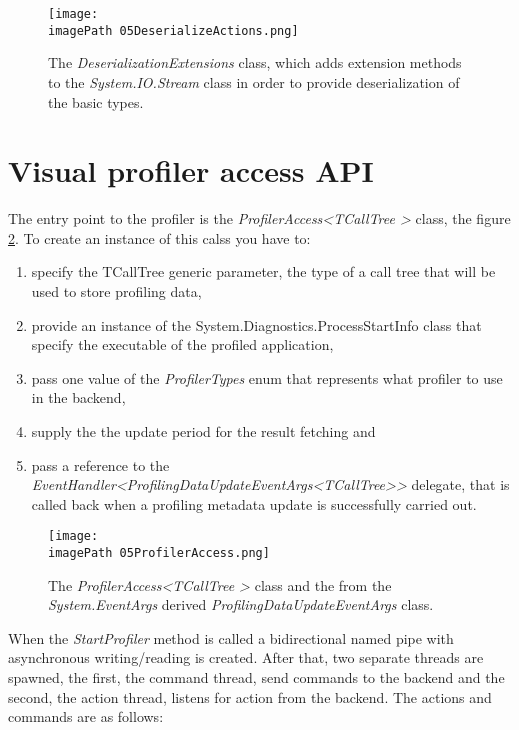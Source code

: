 \begin{figure}
	\centering
		\texttt{[image: \\imagePath 05DeserializeActions.png]}
		\caption{The \textit{DeserializationExtensions} class, which adds extension methods to the \textit{System.IO.Stream} class in order to provide deserialization of the basic types. }
	\label{fig:05DeserializeActions}
\end{figure}

\section{Visual profiler access API}
The entry point to the profiler is the \textit{ProfilerAccess\textless TCallTree \textgreater} class, the figure \ref{fig:05ProfilerAccess}. To create an instance of this calss you have to:
\begin{enumerate}

\item specify the TCallTree generic parameter, the type of a call tree that will be used to store profiling data,

\item provide an instance of the System.Diagnostics.ProcessStartInfo class that specify the executable of the profiled application,

\item pass one value of the \textit{ProfilerTypes} enum that represents what profiler to use in the backend,

\item supply the the update period for the result fetching and

\item pass a reference to the \textit{EventHandler\textless ProfilingDataUpdateEventArgs\textless TCallTree\textgreater\textgreater} delegate, that is called back when a profiling metadata update is successfully carried out.
 
\end{enumerate}
\begin{figure}
	\centering
		\texttt{[image: \\imagePath 05ProfilerAccess.png]}
		\caption{The \textit{ProfilerAccess\textless TCallTree \textgreater} class and the from the \textit{System.EventArgs} derived \textit{ProfilingDataUpdateEventArgs} class. }
	\label{fig:05ProfilerAccess}
\end{figure}

When the \textit{StartProfiler} method is called a bidirectional named pipe with asynchronous writing/reading is created. After that, two separate threads are spawned, the first, the command thread, send commands to the backend and the second, the action thread, listens for action from the backend. The actions and commands are as follows:

